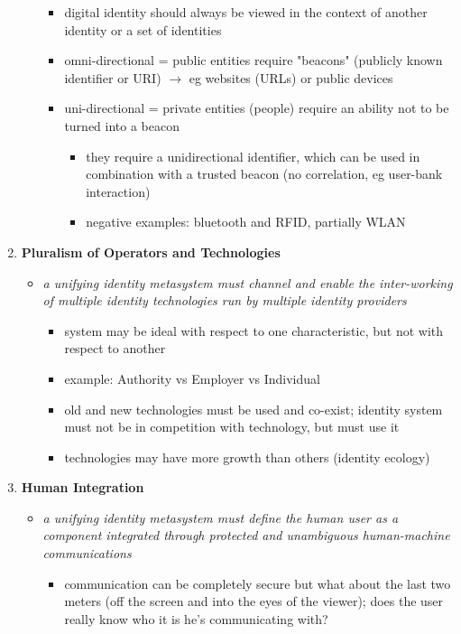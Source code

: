 \documentclass[11pt]{article}
\begin{document}
\begin{enumerate}
\begin{itemize}
\begin{itemize}
\item digital identity should always be viewed in the context of another identity or a set of identities
\item omni-directional = public entities require "beacons" (publicly known identifier or URI) \(\rightarrow\) eg websites (URLs) or public devices
\item uni-directional = private entities (people) require an ability not to be turned into a beacon
\begin{itemize}
\item they require a unidirectional identifier, which can be used in combination with a trusted beacon (no correlation, eg user-bank interaction)
\item negative examples: bluetooth and RFID, partially WLAN
\end{itemize}
\end{itemize}
\end{itemize}
\item \textbf{Pluralism of Operators and Technologies}
\begin{itemize}
\item \emph{a unifying identity metasystem must channel and enable the inter-working of multiple identity technologies run by multiple identity providers}
\begin{itemize}
\item system may be ideal with respect to one characteristic, but not with respect to another
\item example: Authority vs Employer vs Individual
\item old and new technologies must be used and co-exist; identity system must not be in competition with technology, but must use it
\item technologies may have more growth than others (identity ecology)
\end{itemize}
\end{itemize}
\item \textbf{Human Integration}
\begin{itemize}
\item \emph{a unifying identity metasystem must define the human user as a component integrated through protected and unambiguous human-machine communications}
\begin{itemize}
\item communication can be completely secure but what about the last two meters (off the screen and into the eyes of the viewer); does the user really know who it is he's communicating with?

\end{itemize}
\end{itemize}
\end{enumerate}
\end{document}
